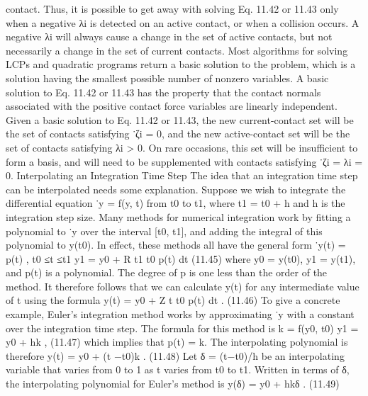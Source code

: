 contact. Thus, it is possible to get away with solving Eq. 11.42 or 11.43 only when a negative λi is detected on an active contact, or when a collision occurs. A negative λi will always cause a change in the set of active contacts, but not necessarily a change in the set of current contacts. Most algorithms for solving LCPs and quadratic programs return a basic solution to the problem, which is a solution having the smallest possible number of nonzero variables. A basic solution to Eq. 11.42 or 11.43 has the property that the contact normals associated with the positive contact force variables are linearly independent. Given a basic solution to Eq. 11.42 or 11.43, the new current-contact set will be the set of contacts satisfying ˙ζi = 0, and the new active-contact set will be the set of contacts satisfying λi > 0. On rare occasions, this set will be insufficient to form a basis, and will need to be supplemented with contacts satisfying ˙ζi = λi = 0. Interpolating an Integration Time Step The idea that an integration time step can be interpolated needs some explanation. Suppose we wish to integrate the differential equation ˙y = f(y, t) from t0 to t1, where t1 = t0 + h and h is the integration step size. Many methods for numerical integration work by fitting a polynomial to ˙y over the interval [t0, t1], and adding the integral of this polynomial to y(t0). In effect, these methods all have the general form ˙y(t) = p(t) , t0 ≤t ≤t1 y1 = y0 + R t1 t0 p(t) dt (11.45) where y0 = y(t0), y1 = y(t1), and p(t) is a polynomial. The degree of p is one less than the order of the method. It therefore follows that we can calculate y(t) for any intermediate value of t using the formula y(t) = y0 + Z t t0 p(t) dt . (11.46) To give a concrete example, Euler’s integration method works by approximating ˙y with a constant over the integration time step. The formula for this method is k = f(y0, t0) y1 = y0 + hk , (11.47) which implies that p(t) = k. The interpolating polynomial is therefore y(t) = y0 + (t −t0)k . (11.48) Let δ = (t−t0)/h be an interpolating variable that varies from 0 to 1 as t varies from t0 to t1. Written in terms of δ, the interpolating polynomial for Euler’s method is y(δ) = y0 + hkδ . (11.49)


